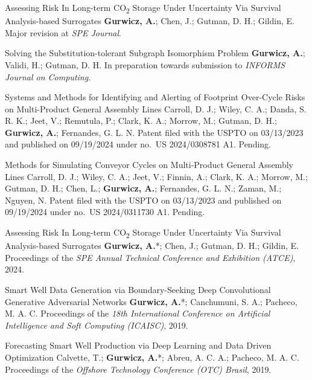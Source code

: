 
\cvpublication
    {Assessing Risk In Long-term CO\textsubscript{2} Storage Under Uncertainty Via Survival Analysis-based Surrogates}
    {\textbf{Gurwicz, A.}; Chen, J.; Gutman, D. H.; Gildin, E.}
    {Major revision at \textit{SPE Journal}.}

\cvpublication
    {Solving the Substitution-tolerant Subgraph Isomorphism Problem}
    {\textbf{Gurwicz, A.}; Validi, H.; Gutman, D. H.}
    {In preparation towards submission to \textit{INFORMS Journal on Computing}.}


\cvpublication
    {Systems and Methods for Identifying and Alerting of Footprint Over-Cycle Risks on Multi-Product General Assembly
    Lines}
    {Carroll, D. J.; Wiley, C. A.; Danda, S. R. K.; Jeet, V.; Remutula, P.; Clark, K. A.; Morrow, M.; Gutman, D. H.;
    \textbf{Gurwicz, A.}; Fernandes, G. L. N.}
    {Patent filed with the USPTO on 03/13/2023 and published on 09/19/2024 under no.\ US 2024/0308781 A1. Pending.}

\cvpublication
    {Methods for Simulating Conveyor Cycles on Multi-Product General Assembly Lines}
    {Carroll, D. J.; Wiley, C. A.; Jeet, V.; Finnin, A.; Clark, K. A.; Morrow, M.; Gutman, D. H.; Chen, L.;
    \textbf{Gurwicz, A.}; Fernandes, G. L. N.; Zaman, M.; Nguyen, N.}
    {Patent filed with the USPTO on 03/13/2023 and published on 09/19/2024 under no.\ US 2024/0311730 A1. Pending.}


\cvpublication
    {Assessing Risk In Long-term CO\textsubscript{2} Storage Under Uncertainty Via Survival Analysis-based Surrogates}
    {\textbf{Gurwicz, A.}*; Chen, J.; Gutman, D. H.; Gildin, E.}
    {Proceedings of the \textit{SPE Annual Technical Conference and Exhibition (ATCE)}, 2024.
    }

\cvpublication
    {Smart Well Data Generation via Boundary-Seeking Deep Convolutional Generative Adversarial Networks}
    {\textbf{Gurwicz, A.}*; Canchumuni, S. A.; Pacheco, M. A. C.}
    {Proceedings of the \textit{18th International Conference on Artificial Intelligence and Soft Computing (ICAISC)},
    2019. }

\cvpublication
    {Forecasting Smart Well Production via Deep Learning and Data Driven Optimization}
    {Calvette, T.; \textbf{Gurwicz, A.}*; Abreu, A. C. A.; Pacheco, M. A. C.}
    {Proceedings of the \textit{Offshore Technology Conference (OTC) Brasil}, 2019. }

